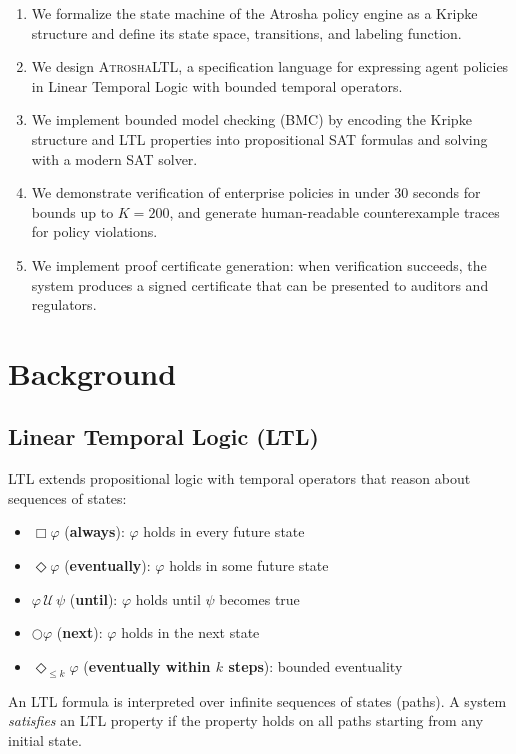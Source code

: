 \documentclass{llncs}
\begin{document}
\begin{enumerate}
    \item We formalize the state machine of the Atrosha policy engine as a Kripke structure and define its state space, transitions, and labeling function.
    \item We design \textsc{AtroshaLTL}, a specification language for expressing agent policies in Linear Temporal Logic with bounded temporal operators.
    \item We implement bounded model checking (BMC) by encoding the Kripke structure and LTL properties into propositional SAT formulas and solving with a modern SAT solver.
    \item We demonstrate verification of enterprise policies in under 30 seconds for bounds up to $K=200$, and generate human-readable counterexample traces for policy violations.
    \item We implement proof certificate generation: when verification succeeds, the system produces a signed certificate that can be presented to auditors and regulators.
\end{enumerate}

\section{Background}

\subsection{Linear Temporal Logic (LTL)}

LTL extends propositional logic with temporal operators that reason about sequences of states:

\begin{itemize}
    \item $\Box \varphi$ (\textbf{always}): $\varphi$ holds in every future state
    \item $\Diamond \varphi$ (\textbf{eventually}): $\varphi$ holds in some future state
    \item $\varphi\, \mathcal{U}\, \psi$ (\textbf{until}): $\varphi$ holds until $\psi$ becomes true
    \item $\bigcirc \varphi$ (\textbf{next}): $\varphi$ holds in the next state
    \item $\Diamond_{\leq k} \varphi$ (\textbf{eventually within $k$ steps}): bounded eventuality
\end{itemize}

An LTL formula is interpreted over infinite sequences of states (paths). A system \textit{satisfies} an LTL property if the property holds on all paths starting from any initial state.
\end{document}
